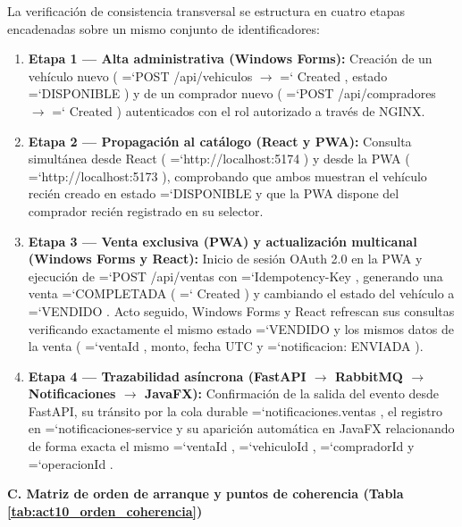 \documentclass[11pt,a4paper]{article}
\renewcommand{\_}{\oldunderscore\allowbreak}
\DeclareRobustCommand{\texttt}[1]{%
  {\upshape\ttfamily\fontsize{9}{10.8}\selectfont\hyphenchar\font=`\-\relax #1}%
}
\begin{document}
\noindent La verificación de consistencia transversal se estructura en cuatro etapas encadenadas sobre un mismo conjunto de identificadores:
\begin{enumerate}[leftmargin=*,itemsep=2pt,topsep=1pt]
  \item \textbf{Etapa 1 — Alta administrativa (Windows Forms):} Creación de un vehículo nuevo (\texttt{POST /\allowbreak{}api/\allowbreak{}vehiculos} $\rightarrow$ \texttt{201 Created}, estado \texttt{DISPONIBLE}) y de un comprador nuevo (\texttt{POST /\allowbreak{}api/\allowbreak{}compradores} $\rightarrow$ \texttt{201 Created}) autenticados con el rol autorizado a través de NGINX.
  \item \textbf{Etapa 2 — Propagación al catálogo (React y PWA):} Consulta simultánea desde React (\texttt{http:\allowbreak{}/\allowbreak{}/\allowbreak{}localhost:\allowbreak{}5174}) y desde la PWA (\texttt{http:\allowbreak{}/\allowbreak{}/\allowbreak{}localhost:\allowbreak{}5173}), comprobando que ambos muestran el vehículo recién creado en estado \texttt{DISPONIBLE} y que la PWA dispone del comprador recién registrado en su selector.
  \item \textbf{Etapa 3 — Venta exclusiva (PWA) y actualización multicanal (Windows Forms y React):} Inicio de sesión OAuth 2.0 en la PWA y ejecución de \texttt{POST /\allowbreak{}api/\allowbreak{}ventas} con \texttt{Idempotency-Key}, generando una venta \texttt{COMPLETADA} (\texttt{201 Created}) y cambiando el estado del vehículo a \texttt{VENDIDO}. Acto seguido, Windows Forms y React refrescan sus consultas verificando exactamente el mismo estado \texttt{VENDIDO} y los mismos datos de la venta (\texttt{ventaId}, monto, fecha UTC y \texttt{notificacion: ENVIADA}).
  \item \textbf{Etapa 4 — Trazabilidad asíncrona (FastAPI $\rightarrow$ RabbitMQ $\rightarrow$ Notificaciones $\rightarrow$ JavaFX):} Confirmación de la salida del evento desde FastAPI, su tránsito por la cola durable \texttt{notificaciones.\allowbreak{}ventas}, el registro en \texttt{notificaciones-service} y su aparición automática en JavaFX relacionando de forma exacta el mismo \texttt{ventaId}, \texttt{vehiculoId}, \texttt{compradorId} y \texttt{operacionId}.
\end{enumerate}

\vspace{0.2cm}
\noindent\textbf{C. Matriz de orden de arranque y puntos de coherencia (Tabla \ref{tab:act10_orden_coherencia})}
\end{document}
